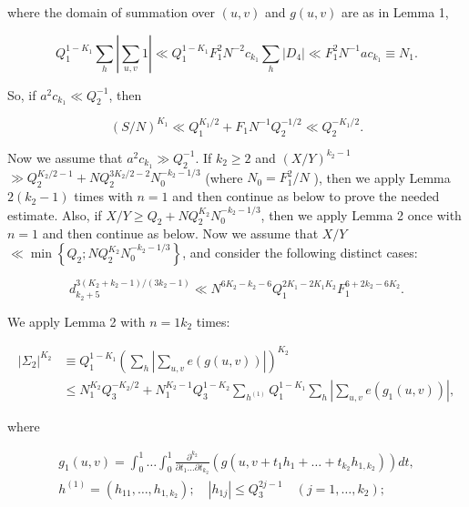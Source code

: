 \documentclass[10pt]{article}
\begin{document}
where the domain of summation over $(u, v)$ and $g(u, v)$ are as in Lemma 1,

$$
Q_{1}^{1-K_{1}} \sum_{h}\left|\sum_{u, v} 1\right| \ll Q_{1}^{1-K_{1}} F_{1}^{2} N^{-2} c_{k_{1}} \sum_{h}\left|D_{4}\right| \ll F_{1}^{2} N^{-1} a c_{k_{1}} \equiv N_{1} .
$$

So, if $a^{2} c_{k_{1}} \ll Q_{2}^{-1}$, then

$$
(S / N)^{K_{1}} \ll Q_{1}^{K_{1} / 2}+F_{1} N^{-1} Q_{2}^{-1 / 2} \ll Q_{2}^{-K_{1} / 2} .
$$

Now we assume that $a^{2} c_{k_{1}} \gg Q_{2}^{-1}$. If $k_{2} \geqslant 2$ and $(X / Y)^{k_{2}-1}$ $\gg Q_{2}^{K_{2} / 2-1}+N Q_{2}^{3 K_{2} / 2-2} N_{0}^{-k_{2}-1 / 3}$ (where $N_{0}=F_{1}^{2} / N$ ), then we apply Lemma $2\left(k_{2}-1\right)$ times with $n=1$ and then continue as below to prove the needed estimate. Also, if $X / Y \geqslant Q_{2}+N Q_{2}^{K_{2}} N_{0}^{-k_{2}-1 / 3}$, then we apply Lemma 2 once with $n=1$ and then continue as below. Now we assume that $X / Y$ $\ll \min \left\{Q_{2} ; N Q_{2}^{K_{2}} N_{0}^{-k_{2}-1 / 3}\right\}$, and consider the following distinct cases:


\begin{equation*}
d_{k_{2}+5}^{3\left(K_{2}+k_{2}-1\right) /\left(3 k_{2}-1\right)} \ll N^{6 K_{2}-k_{2}-6} Q_{1}^{2 K_{1}-2 K_{1} K_{2}} F_{1}^{6+2 k_{2}-6 K_{2}} . \tag{a}
\end{equation*}


We apply Lemma 2 with $n=1 k_{2}$ times:

$$
\begin{aligned}
\left|\Sigma_{2}\right|^{K_{2}} & \equiv Q_{1}^{1-K_{1}}\left(\sum_{h}\left|\sum_{u, v} e(g(u, v))\right|\right)^{K_{2}} \\
& \leqslant N_{1}^{K_{2}} Q_{3}^{-K_{2} / 2}+N_{1}^{K_{2}-1} Q_{3}^{1-K_{2}} \sum_{h^{(1)}} Q_{1}^{1-K_{1}} \sum_{h}\left|\sum_{u, v} e\left(g_{1}(u, v)\right)\right|,
\end{aligned}
$$

where

$$
\begin{gathered}
g_{1}(u, v)=\int_{0}^{1} \ldots \int_{0}^{1} \frac{\partial^{k_{2}}}{\partial t_{1} \ldots \partial t_{k_{2}}}\left(g\left(u, v+t_{1} h_{1}+\ldots+t_{k_{2}} h_{1, k_{2}}\right)\right) d t, \\
h^{(1)}=\left(h_{11}, \ldots, h_{1, k_{2}}\right) ; \quad\left|h_{1 j}\right| \leqslant Q_{3}^{2 j-1} \quad\left(j=1, \ldots, k_{2}\right) ;
\end{gathered}
$$
\end{document}
